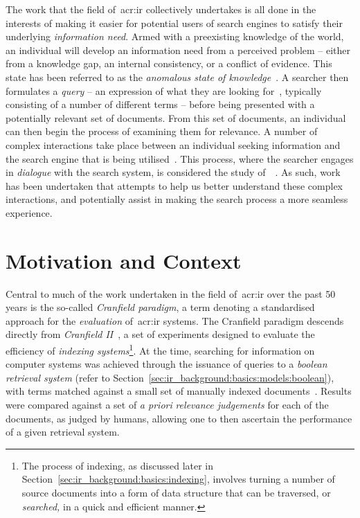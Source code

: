 The work that the field of~\gls{acr:ir} collectively undertakes is all done in the interests of making it easier for potential users of search engines to satisfy their underlying \emph{information need}. Armed with a preexisting knowledge of the world, an individual will develop an information need from a perceived problem -- either from a knowledge gap, an internal consistency, or a conflict of evidence. This state has been referred to as the \emph{anomalous state of knowledge}~\citep{belkin1980ask}. A searcher then formulates a \emph{query} -- an expression of what they are looking for~\citep{borlund2003iir_model}, typically consisting of a number of different terms -- before being presented with a potentially relevant set of documents. From this set of documents, an individual can then begin the process of examining them for relevance. A number of complex interactions take place between an individual seeking information and the search engine that is being utilised~\citep{ingwersen2005theturn}. This process, where the searcher engages in \emph{dialogue} with the search system, is considered the study of~~\citep{borlund2003iir_model}. As such, work has been undertaken that attempts to help us better understand these complex interactions, and potentially assist in making the search process a more seamless experience.

\section{Motivation and Context}\label{sec:intro:motivation}
Central to much of the work undertaken in the field of~\gls{acr:ir} over the past 50 years is the so-called \emph{Cranfield paradigm}, a term denoting a standardised approach for the \emph{evaluation} of~\gls{acr:ir} systems. The Cranfield paradigm descends directly from \emph{Cranfield II}~\citep{aslib1966factors}, a set of experiments designed to evaluate the efficiency of \emph{indexing systems}\footnote{The process of indexing, as discussed later in Section~\ref{sec:ir_background:basics:indexing}, involves turning a number of source documents into a form of data structure that can be traversed, or \emph{searched,} in a quick and efficient manner.}. At the time, searching for information on computer systems was achieved through the issuance of queries to a \emph{boolean retrieval system} (refer to Section~\ref{sec:ir_background:basics:models:boolean}), with terms matched against a small set of manually indexed documents~\citep{harman2010cranfield}. Results were compared against a set of \emph{a priori} \emph{relevance judgements} for each of the documents, as judged by humans, allowing one to then ascertain the performance of a given retrieval system.

